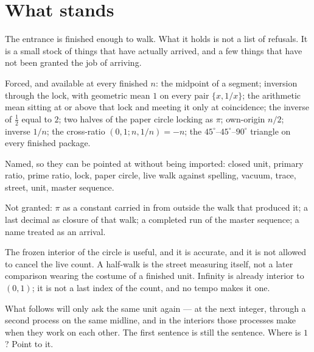 \documentclass[10pt,a4paper]{article}
\theoremstyle{plain}
\theoremstyle{definition}
\theoremstyle{remark}
\begin{document}
\section{What stands}

The entrance is finished enough to walk.
What it holds is not a list of refusals.
It is a small stock of things that have actually arrived, and a few things that have not been granted the job of arriving.

Forced, and available at every finished \(n\): the midpoint of a segment; inversion through the lock, with geometric mean \(1\) on every pair \(\{x,1/x\}\); the arithmetic mean sitting at or above that lock and meeting it only at coincidence; the inverse of \(\tfrac12\) equal to \(2\); two halves of the paper circle locking as \(\pi\); own-origin \(n/2\); inverse \(1/n\); the cross-ratio \((0,1;n,1/n)=-n\); the \(45^\circ\)--\(45^\circ\)--\(90^\circ\) triangle on every finished package.

Named, so they can be pointed at without being imported: closed unit, primary ratio, prime ratio, lock, paper circle, live walk against spelling, vacuum, trace, street, unit, master sequence.

Not granted: \(\pi\) as a constant carried in from outside the walk that produced it; a last decimal as closure of that walk; a completed run of the master sequence; a name treated as an arrival.

The frozen interior of the circle is useful, and it is accurate, and it is not allowed to cancel the live count.
A half-walk is the street measuring itself, not a later comparison wearing the costume of a finished unit.
Infinity is already interior to \((0,1)\); it is not a last index of the count, and no tempo makes it one.

What follows will only ask the same unit again --- at the next integer, through a second process on the same midline, and in the interiors those processes make when they work on each other.
The first sentence is still the sentence.
Where is \(1\)?
Point to it.
\end{document}
